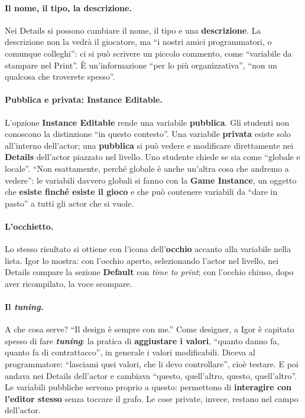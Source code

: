 \paragraph{Il nome, il tipo, la descrizione.} Nei Details si possono cambiare il nome, il
tipo e una \textbf{descrizione}. La descrizione non la vedrà il giocatore, ma ``i nostri
amici programmatori, o comunque colleghi'': ci si può scrivere un piccolo commento,
come ``variabile da stampare nel Print''. È un'informazione ``per lo più organizzativa'',
``non un qualcosa che troverete spesso''.

\paragraph{Pubblica e privata: Instance Editable.} L'opzione \textbf{Instance Editable}
rende una variabile \textbf{pubblica}. Gli studenti non conoscono la distinzione ``in
questo contesto''. Una variabile \textbf{privata} esiste solo all'interno dell'actor;
una \textbf{pubblica} si può vedere e modificare direttamente nei \textbf{Details}
dell'actor piazzato nel livello. Uno studente chiede se sia come ``globale e locale''.
``Non esattamente, perché globale è anche un'altra cosa che andremo a vedere'': le
variabili davvero globali si fanno con la \textbf{Game Instance}, un oggetto che
\textbf{esiste finché esiste il gioco} e che può contenere variabili da ``dare in pasto''
a tutti gli actor che si vuole.

\paragraph{L'occhietto.} Lo stesso risultato si ottiene con l'icona
dell'\textbf{occhio} accanto alla variabile nella lista. Igor lo mostra: con l'occhio
aperto, selezionando l'actor nel livello, nei Details compare la sezione
\textbf{Default} con \emph{time to print}; con l'occhio chiuso, dopo aver ricompilato,
la voce scompare.

\paragraph{Il \emph{tuning}.} A che cosa serve? ``Il design è sempre con me.'' Come
designer, a Igor è capitato spesso di fare \textbf{\emph{tuning}}: la pratica di
\textbf{aggiustare i valori}, ``quanto danno fa, quanto fa di contrattacco'', in
generale i valori modificabili. Diceva al programmatore: ``lasciami quei valori, che li
devo controllare'', cioè testare. E poi andava nei Details dell'actor e cambiava
``questo, quell'altro, questo, quell'altro''. Le variabili pubbliche servono proprio a
questo: permettono di \textbf{interagire con l'editor stesso} senza toccare il grafo. Le
cose private, invece, restano nel campo dell'actor.

